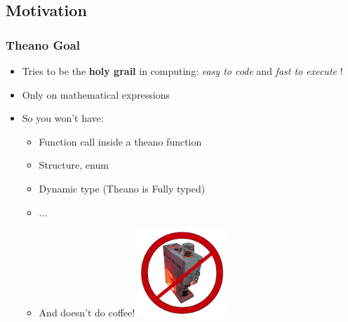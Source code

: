 \documentclass[a4paper,9pt]{beamer}
\begin{document}
\subsection{Motivation}
\begin{frame}
  \frametitle{Theano Goal}
\begin{itemize}
\item Tries to be the {\bf holy grail} in computing: {\it easy to code} and {\it fast to execute} !
\item Only on mathematical expressions
\item So you won't have:
  \begin{itemize}
  \item Function call inside a theano function
  \item Structure, enum
  \item Dynamic type (Theano is Fully typed)
  \item ...
  \item And doesn't do coffee! \includegraphics[width=1.3in]{pics/Caffeine_Machine_no_background_red.png}
  \end{itemize}
\end{itemize}
\end{frame}

\end{document}
